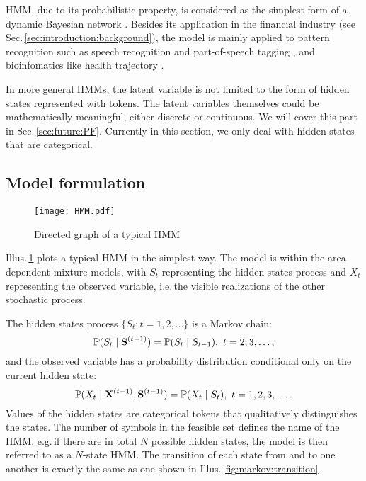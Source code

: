 HMM, due to its probabilistic property, 
is considered as the simplest form of a dynamic Bayesian network \cite{wiki:hmm}.
Besides its application in the financial industry (see Sec.\,\ref{sec:introduction:background}),
the model is mainly applied to pattern recognition 
such as speech recognition and part-of-speech tagging \cite{wiki:hmm,Rabiner:1989hs},
and bioinfomatics like health trajectory \cite{Ghassempour:2014ew}.

In more general HMMs,
the latent variable is not limited to the form of hidden states represented with tokens.
The latent variables themselves could be mathematically meaningful,
either discrete or continuous.
We will cover this part in Sec.\,\ref{sec:future:PF}.
Currently in this section, we only deal with hidden states that are categorical.


\subsection{Model formulation}
\label{sec:HMM:overview:formulation}

        \begin{figure}[!hbt]
        \center
        \texttt{[image: HMM.pdf]}
        \caption{Directed graph of a typical HMM}
        \label{fig:HMM:overview}
        \end{figure}
Illus.\,\ref{fig:HMM:overview} plots a typical HMM in the simplest way.
The model is within the area dependent mixture models,
with $S_t$ representing the hidden states process and 
$X_t$ representing the observed variable,
i.e.\,the visible realizations of the other stochastic process.

The hidden states process $\{S_t \colon t = 1,2,\dots\}$ is a Markov chain: 
        \begin{equation}
        \label{eq:HMM:states}
        \mathbb{P}(S_t \mid {\mathbf S}^{(t-1)}) = \mathbb{P}(S_t \mid S_{t-1}),\ t = 2,3,\dots,
        \end{equation}
and the observed variable has a probability distribution
conditional only on the current hidden state:
        \begin{equation}
        \label{eq:HMM:prob}
        \prob{X_t \mid \bX^{(t-1)}, \bS^{(t-1)}} = \prob{X_t \mid S_t},\ t = 1,2,3,\dots.
        \end{equation}
Values of the hidden states are categorical tokens that qualitatively distinguishes the states.
The number of symbols in the feasible set defines the name of the HMM,
e.g.\,if there are in total $N$ possible hidden states,
the model is then referred to as a $N$-state HMM.
The transition of each state from and to one another 
is exactly the same as one shown in Illus.\,\ref{fig:markov:transition}

